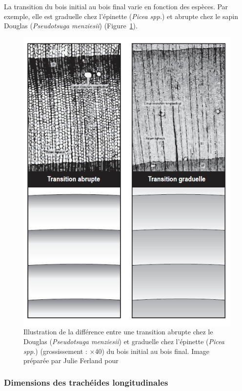 La transition du bois initial au bois final varie en fonction des espèces. Par exemple, elle est graduelle chez l'épinette (\textit{Picea spp.}) et abrupte chez le sapin Douglas (\textit{Pseudotsuga menziesii}) (Figure~\ref{transition}).

\begin{figure}[h]
\centering
\includegraphics[scale=0.6]{img/ch3_transition}
\caption{Illustration de la différence entre une transition abrupte chez le Douglas (\textit{Pseudotsuga menziesii}) et graduelle chez l'épinette (\textit{Picea spp.}) (grossissement : $\times$40) du bois initial au bois final. Image préparée par Julie Ferland pour \cite{achim2010dendroecologie}}
\label{transition}
\end{figure}

\subsubsection{Dimensions des trachéides longitudinales}

